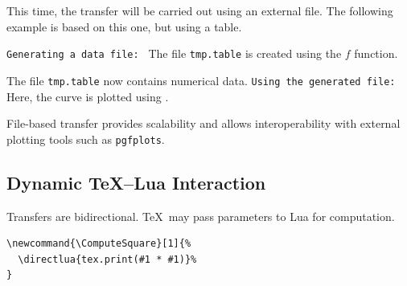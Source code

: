 This time, the transfer will be carried out using an external file. The following example is based on this one, but using a table.

\texttt{Generating a data file: } The file \texttt{tmp.table} is created using the $f$ function.

The file \texttt{tmp.table} now contains numerical data.
 \texttt{Using the generated file: } Here, the curve is plotted using .



\begin{tkzexample}[latex=.5\textwidth]

 \end{tkzexample}





File-based transfer provides scalability and allows
interoperability with external plotting tools such as
\texttt{pgfplots}.


\subsection{Dynamic \TeX--Lua Interaction}
\label{subsec:dynamic_transfer}

Transfers are bidirectional.
\TeX\ may pass parameters to Lua for computation.

\medskip
\begin{verbatim}
\newcommand{\ComputeSquare}[1]{%
  \directlua{tex.print(#1 * #1)}%
}
\end{verbatim}

